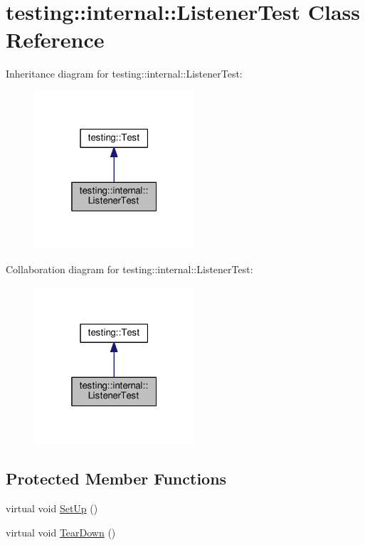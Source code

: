 \hypertarget{classtesting_1_1internal_1_1ListenerTest}{}\section{testing\+:\+:internal\+:\+:Listener\+Test Class Reference}
\label{classtesting_1_1internal_1_1ListenerTest}


Inheritance diagram for testing\+:\+:internal\+:\+:Listener\+Test\+:\nopagebreak
\begin{figure}[H]
\begin{center}
\leavevmode
\includegraphics[width=169pt]{classtesting_1_1internal_1_1ListenerTest__inherit__graph}
\end{center}
\end{figure}


Collaboration diagram for testing\+:\+:internal\+:\+:Listener\+Test\+:\nopagebreak
\begin{figure}[H]
\begin{center}
\leavevmode
\includegraphics[width=169pt]{classtesting_1_1internal_1_1ListenerTest__coll__graph}
\end{center}
\end{figure}
\subsection*{Protected Member Functions}
\begin{DoxyCompactItemize}
\item 
virtual void \hyperlink{classtesting_1_1internal_1_1ListenerTest_ace3dbe36b705ddf320518e6cdd919bc8}{Set\+Up} ()
\item 
virtual void \hyperlink{classtesting_1_1internal_1_1ListenerTest_ad112535025d668e3ea14e71d8741c810}{Tear\+Down} ()
\end{DoxyCompactItemize}
